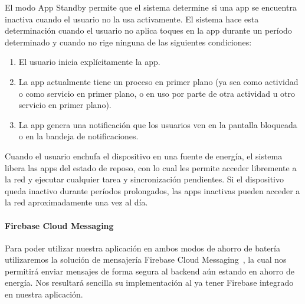 El modo App Standby permite que el sistema determine si una app se
 encuentra inactiva cuando el usuario no la usa activamente. El sistema
 hace esta determinación cuando el usuario no aplica toques en la app
 durante un período determinado y cuando no rige ninguna de las 
siguientes condiciones:
\begin{enumerate}

\item El usuario inicia explícitamente la app.
\item La app actualmente tiene un proceso en primer plano 
(ya sea como actividad o como servicio en primer plano, o en uso por
 parte de otra actividad u otro servicio en primer plano).
\item La app genera una notificación que los usuarios ven en la pantalla 
bloqueada o en la bandeja de notificaciones.
\end{enumerate}

Cuando el usuario enchufa el dispositivo en una fuente de energía,
 el sistema libera las apps del estado de reposo, con lo cual les permite
 acceder libremente a la red y ejecutar cualquier tarea y sincronización
 pendientes. Si el dispositivo queda inactivo durante períodos prolongados, 
las apps inactivas pueden acceder a la red aproximadamente una vez al día.

\paragraph{Firebase Cloud Messaging}

Para poder utilizar nuestra aplicación en ambos modos de ahorro 
de batería utilizaremos la solución de mensajería 
 Firebase Cloud Messaging~\cite{FIREBASECLOUDMESS}, la cual nos
 permitirá enviar mensajes de forma segura al backend aún estando en 
ahorro de energía. Nos resultará sencilla su implementación al ya tener 
Firebase integrado en nuestra aplicación.
